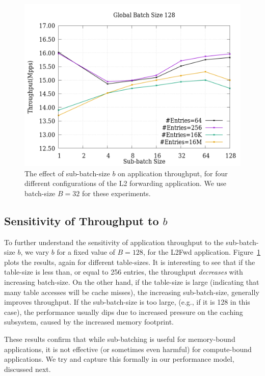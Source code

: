 \begin{figure}[ht]
\includegraphics[width = \linewidth]{Figures/Subbatching.png}
\caption{The effect of sub-batch-size $b$ on application throughput, for four different configurations of the L2 forwarding application. We use batch-size $B=32$ for these experiments.}
\label{fig:subbatchfigure}
\end{figure}

\subsection{Sensitivity of Throughput to $b$}

To further understand the sensitivity of application throughput to the sub-batch-size $b$, we vary
$b$ for a fixed value of $B=128$, for the L2Fwd application. Figure~\ref{fig:subbatchfigure} plots
the results, again for different table-sizes. It is interesting to see
that if the table-size is less than, or equal to 256 entries, the throughput
{\em decreases} with increasing batch-size. On the other hand, if the table-size
is large (indicating that many table accesses will be cache misses), the
increasing sub-batch-size, generally improves throughput. If the sub-batch-size
is too large, (e.g., if it is 128 in this case), the performance usually dips
due to increased pressure on the caching subsystem, caused by the
increased memory footprint.

These results confirm that while sub-batching is useful for memory-bound
applications, it is not effective (or sometimes even harmful) for
compute-bound applications. We try and capture this formally in our
performance model, discussed next.

